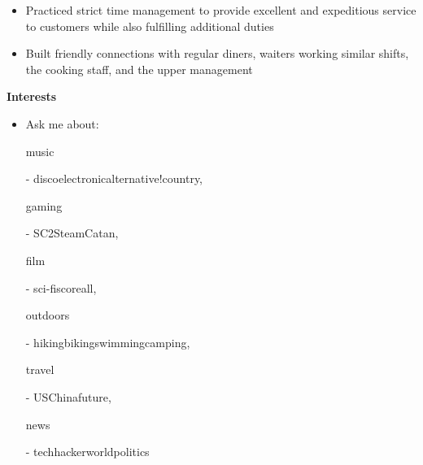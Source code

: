 \documentclass[11pt]{article}
\begin{document}
\vspace{-1.0em}
\begin{itemize}
	\item Practiced strict time management to provide excellent and expeditious service to customers while also fulfilling additional duties
	\vspace{-0.5em}
	\item Built friendly connections with regular diners, waiters working similar shifts, the cooking staff, and the upper management
\end{itemize}

\vspace{-0.3em}

\begin{LARGE}
	\bf Interests
\end{LARGE}

\vspace{-0.5em}

\begin{itemize}
	\item Ask me about: \begin{bf}music\end{bf} - disco\textbar electronic\textbar alternative\textbar !country, \begin{bf}gaming\end{bf} - SC2\textbar Steam\textbar Catan, \begin{bf}film\end{bf} - sci-fi\textbar score\textbar all, \begin{bf}outdoors\end{bf} - hiking\textbar biking\textbar swimming\textbar camping, \begin{bf}travel\end{bf} - US\textbar China\textbar future, \begin{bf}news\end{bf} - tech\textbar hacker\textbar world\textbar politics
\end{itemize}
\end{document}
